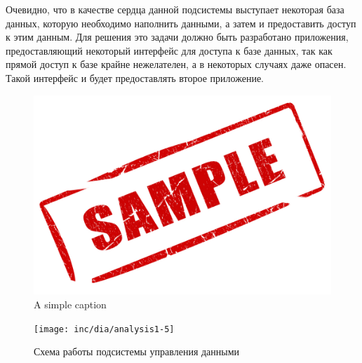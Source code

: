 Очевидно, что в качестве сердца данной подсистемы выступает некоторая база данных, которую необходимо наполнить данными, а затем и предоставить доступ к этим данным. Для решения это задачи должно быть разработано приложения, предоставляющий некоторый интерфейс для доступа к базе данных, так как прямой доступ к базе крайне нежелателен, а в некоторых случаях даже опасен. Такой интерфейс и будет предоставлять второе приложение.

\begin{figure}[ht!]
 \centering 
 \includegraphics[width=\textwidth]{inc/raster/sample.jpg} 
 \caption{A simple caption} 
 \label{overflow} 
\end{figure}

\begin{figure}
  \centering
  \texttt{[image: inc/dia/analysis1-5]}
  \caption{Схема работы подсистемы управления данными}
  \label{fig:fig05}
\end{figure}


